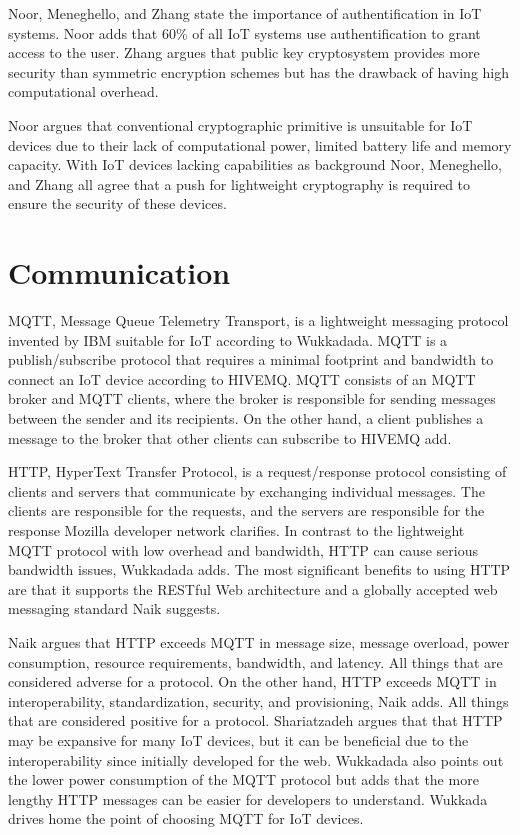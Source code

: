 Noor, Meneghello, and Zhang state the importance of authentification in IoT systems\cite{Noor2019,Meneghello2019,Zhang2014}. 
Noor adds that 60\% of all IoT systems use authentification to grant access to the user\cite{Noor2019}.  
Zhang argues that public key cryptosystem provides more security than symmetric encryption schemes but has the drawback of having high computational overhead\cite{Zhang2014}. 

Noor argues that conventional cryptographic primitive is unsuitable for IoT devices due to their lack of computational power, limited battery life and memory capacity\cite{Noor2019}.
With IoT devices lacking capabilities as background Noor, Meneghello, and Zhang all agree that a push for lightweight cryptography is required to ensure the security of these devices\cite{Noor2019,Meneghello2019,Zhang2014}. 

\section{Communication} 
MQTT, Message Queue Telemetry Transport, is a lightweight messaging protocol invented by IBM suitable for IoT according to Wukkadada\cite{Wukkadada2018}. 
MQTT is a publish/subscribe protocol that requires a minimal footprint and bandwidth to connect an IoT device according to HIVEMQ\cite{MQTT2021}.
MQTT consists of an MQTT broker and MQTT clients, where the broker is responsible for sending messages between the sender and its recipients\cite{Wukkadada2018}.
On the other hand, a client publishes a message to the broker that other clients can subscribe to HIVEMQ add\cite{MQTT2021}.

HTTP, HyperText Transfer Protocol, is a request/response protocol consisting of clients and servers that communicate by exchanging individual messages. 
The clients are responsible for the requests, and the servers are responsible for the response Mozilla developer network clarifies\cite{HTTP2021}.  
In contrast to the lightweight MQTT protocol with low overhead and bandwidth, HTTP can cause serious bandwidth issues, Wukkadada adds\cite{Wukkadada2018}. 
The most significant benefits to using HTTP are that it supports the RESTful Web architecture and a globally accepted web messaging standard Naik suggests\cite{Naik2017}.  

Naik argues that HTTP exceeds MQTT in message size, message overload, power consumption, resource requirements, bandwidth, and latency. 
All things that are considered adverse for a protocol\cite{Naik2017}.
On the other hand, HTTP exceeds MQTT in interoperability, standardization, security, and provisioning, Naik adds.
All things that are considered positive for a protocol.
Shariatzadeh argues that that HTTP may be expansive for many IoT devices, but it can be beneficial due to the interoperability since initially developed for the web\cite{Shariatzadeh2016}.
Wukkadada also points out the lower power consumption of the MQTT protocol but adds that the more lengthy HTTP messages can be easier for developers to understand\cite{Wukkadada2018}.
Wukkada drives home the point of choosing MQTT for IoT devices.